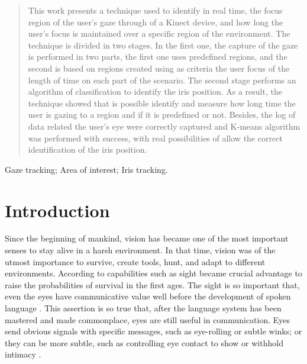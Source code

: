 \documentclass[10pt, conference]{IEEEtran}
\begin{document}
\maketitle



\begin{abstract}
	This work presents a technique used to identify in real time, the focus region of the user's gaze through of a Kinect device, and how long the user’s focus is maintained over a specific region of the environment. The technique is divided in two stages. In the first one, the capture of the gaze is performed in two parts, the first one uses predefined regions, and the second is based on regions created using as criteria the user focus of the length of time on each part of the scenario. The second stage performs an algorithm of classification to identify the iris position. As a result, the technique showed that is possible identify and measure how long time the user is gazing to a region and if it is predefined or not. Besides, the log of data related the user's eye were correctly captured and K-means algorithm was performed with success, with real possibilities of allow the correct identification of the iris position.
\end{abstract}

\begin{IEEEkeywords}
	Gaze tracking; Area of interest; Iris tracking.
\end{IEEEkeywords}


\IEEEpeerreviewmaketitle

\section{Introduction}
	Since the beginning of mankind, vision has became one of the most important senses to stay alive in a harsh environment. 
	In that time, vision was of the utmost importance to survive, create tools, hunt, and adapt to different environments. 
	According to \cite{1} capabilities such as sight became crucial advantage to raise the probabilities of survival in the first ages.
	The sight is so important that, even the eyes have communicative value well before the development of spoken language \cite{2}.
	This assertion is so true that, after the language system has been mastered and made commonplace, eyes are still useful in communication. 
	Eyes send obvious signals with specific messages, such as eye-rolling or subtle winks; or they can be more subtle, such as controlling eye contact to show or withhold intimacy \cite{3}.
\end{document}
